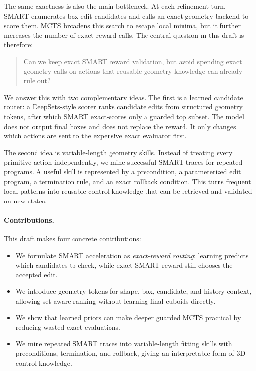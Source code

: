\documentclass[10pt,twocolumn,letterpaper]{article}
\begin{document}
The same exactness is also the main bottleneck.  At each refinement turn, SMART
enumerates box edit candidates and calls an exact geometry backend to score
them.  MCTS broadens this search to escape local minima, but it further
increases the number of exact reward calls.  The central question in this draft
is therefore:

\begin{quote}
Can we keep exact SMART reward validation, but avoid spending exact geometry
calls on actions that reusable geometry knowledge can already rule out?
\end{quote}

We answer this with two complementary ideas.  The first is a learned candidate
router: a DeepSets-style scorer ranks candidate edits from structured geometry
tokens, after which SMART exact-scores only a guarded top subset.  The model
does not output final boxes and does not replace the reward.  It only changes
which actions are sent to the expensive exact evaluator first.

The second idea is variable-length geometry skills.  Instead of treating every
primitive action independently, we mine successful SMART traces for repeated
programs.  A useful skill is represented by a precondition, a parameterized
edit program, a termination rule, and an exact rollback condition.  This turns
frequent local patterns into reusable control knowledge that can be retrieved
and validated on new states.

\paragraph{Contributions.}
This draft makes four concrete contributions:
\begin{itemize}
\item We formulate SMART acceleration as \emph{exact-reward routing}: learning
predicts which candidates to check, while exact SMART reward still chooses the
accepted edit.
\item We introduce geometry tokens for shape, box, candidate, and history
context, allowing set-aware ranking without learning final cuboids directly.
\item We show that learned priors can make deeper guarded MCTS practical by
reducing wasted exact evaluations.
\item We mine repeated SMART traces into variable-length fitting skills with
preconditions, termination, and rollback, giving an interpretable form of 3D
control knowledge.
\end{itemize}
\end{document}
